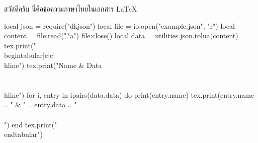 \documentclass{article}
\begin{document}
สวัสดีครับ นี่คือข้อความภาษาไทยในเอกสาร LaTeX


\begin{luacode*}
local json = require("dkjson")
local file = io.open("example.json", "r")
local content = file:read("*a")
file:close()
local data = utilities.json.tolua(content)
tex.print("\\begin{tabular}{|c|c|}\\hline")
tex.print("Name & Data \\\\ \\hline")
for i, entry in ipairs(data.data) do
  print(entry.name)
  tex.print(entry.name .. " & " .. entry.data .. " \\\\")
end
tex.print("\\end{tabular}")

\end{luacode*}
\end{document}

